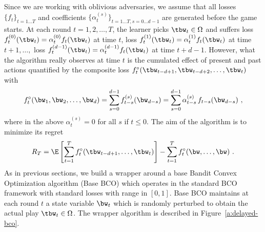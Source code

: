 Since we are working with oblivious adversaries, we assume that all losses $\{f_{t}\}_{t=1\dots T}$ and coefficients $\{\alpha^{(s)}_{t}\}_{t=1\dots T,s=0\dots d-1}$ are generated before the game starts. At each round $t= 1, 2, \ldots, T$, the learner picks $\tbw_t \in \Omega$ and suffers loss $f^{(0)}_t(\tbw_t) = \alpha^{(0)}_{t}f_t(\tbw_t)$ at time $t$, loss $f^{(1)}_{t}(\tbw_t) =  \alpha^{(1)}_{t} f_{t}(\tbw_t)$ at time $t+1,\ldots,$ loss $f^{(d-1)}_t(\tbw_t) =  \alpha^{(d-1)}_{t}f_t(\tbw_t)$ at time $t+d-1$. However, what the algorithm really observes at time $t$ is the cumulated effect of present and past actions quantified by the composite loss
\(
\fcomp_t(\tbw_{t-d+1},\tbw_{t-d+2},\ldots, \tbw_t)
\)
with 
\[
\fcomp_t(\bw_{1},\bw_{2},\ldots, \bw_d)= \sum_{s=0}^{d-1} f_{t-s}^{(s)}(\bw_{d-s}) = \sum_{s=0}^{d-1} \alpha_{t-s}^{(s)}\,f_{t-s}(\bw_{d-s})~,
\]
where in the above $\alpha_t^{(s)} = 0$ for all $s$ if $t \leq 0$.
The aim of the algorithm is to minimize its regret 
\[
	R_T =\E\left[\sum_{t=1}^T \fcomp_t(\tbw_{t-d+1},\dots,\tbw_t)\right] - \sum_{t=1}^T \fcomp_t(\bw,\dots,\bw)~.
\] 
As in previous sections, we build a wrapper around a base Bandit Convex Optimization algorithm (Base BCO) which operates in the standard BCO framework with standard losses with range in $[0,1]$. Base BCO maintains at each round $t$ a state variable $\bw_t$ which is randomly perturbed to obtain the actual play $\tbw_t \in \Omega$. The wrapper algorithm is described in Figure~\ref{a:delayed-bco}.
%
